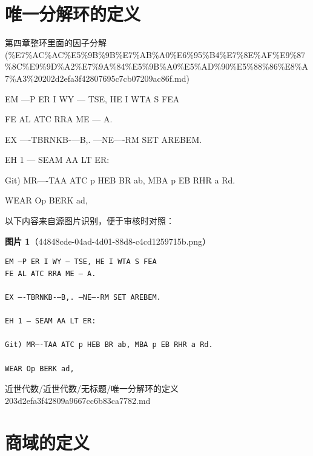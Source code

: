 \section*{唯一分解环的定义}

\begin{note}[来源上级主题]

第四章整环里面的因子分解 (\%E7\%AC\%AC\%E5\%9B\%9B\%E7\%AB\%A0\%E6\%95\%B4\%E7\%8E\%AF\%E9\%87\%8C\%E9\%9D\%A2\%E7\%9A\%84\%E5\%9B\%A0\%E5\%AD\%90\%E5\%88\%86\%E8\%A7\%A3\%20202d2efa3f42807695c7cb07209ac86f.md)

\end{note}

\begin{definition}[唯一分解环的定义]

EM —P ER I WY — TSE, HE I WTA S FEA

FE AL ATC RRA ME — A.

EX —-TBRNKB-—B,. —NE—-RM SET AREBEM.

EH 1 — SEAM AA LT ER:

Git) MR—-TAA ATC p HEB BR ab, MBA p EB RHR a Rd.

WEAR Op BERK ad,

\end{definition}

\begin{note}
以下内容来自源图片识别，便于审核时对照：

\textbf{图片 1}（44848cde-04ad-4d01-88d8-c4cd1259715b.png）
\begin{Verbatim}[fontsize=\small]
EM —P ER I WY — TSE, HE I WTA S FEA
FE AL ATC RRA ME — A.

EX —-TBRNKB-—B,. —NE—-RM SET AREBEM.

EH 1 — SEAM AA LT ER:

Git) MR—-TAA ATC p HEB BR ab, MBA p EB RHR a Rd.

WEAR Op BERK ad,
\end{Verbatim}

\end{note}

\begin{note}[来源路径]

近世代数/近世代数/无标题/唯一分解环的定义 203d2efa3f42809a9667cc6b83ca7782.md

\end{note}

\section*{商域的定义}

